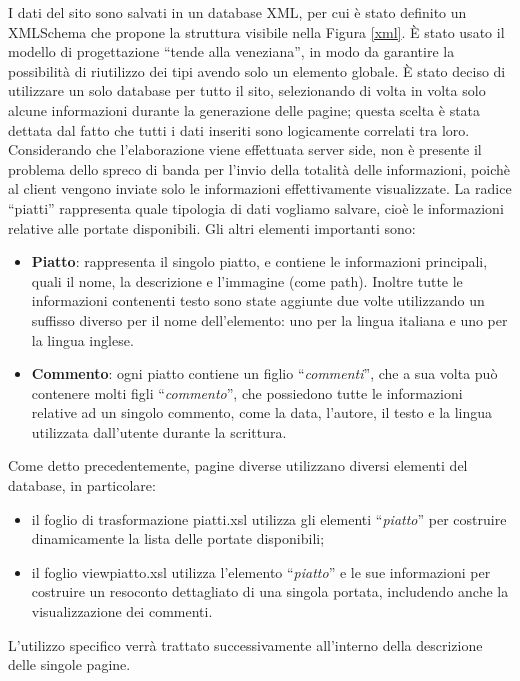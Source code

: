 \documentclass[10pt,a4paper,onecolumn]{article}
\begin{document}
I dati del sito sono salvati in un database XML, per cui è stato definito un XMLSchema che propone la struttura visibile nella Figura \ref{xml}. È stato usato il modello di progettazione ``tende alla veneziana'', in modo da garantire la possibilità di riutilizzo dei tipi avendo solo un elemento globale. 
È stato deciso di utilizzare un solo database per tutto il sito, selezionando di volta in volta solo alcune informazioni durante la generazione delle pagine; questa scelta è stata dettata dal fatto che tutti i dati inseriti sono logicamente correlati tra loro.
Considerando che l'elaborazione viene effettuata server side, non è presente il problema dello spreco di banda per l'invio della totalità delle informazioni, poichè al client vengono inviate solo le informazioni effettivamente visualizzate.
La radice ``piatti'' rappresenta quale tipologia di dati vogliamo salvare, cioè le informazioni relative alle portate disponibili.
Gli altri elementi importanti sono:
\begin{itemize}
 \item \textbf{Piatto}: rappresenta il singolo piatto, e contiene le informazioni principali, quali il nome, la descrizione e l'immagine (come path). Inoltre tutte le informazioni contenenti testo sono state aggiunte due volte utilizzando un suffisso diverso per il nome dell'elemento: uno per la lingua italiana e uno per la lingua inglese.
 \item \textbf{Commento}: ogni piatto contiene un figlio ``\textit{commenti}'', che a sua volta può contenere molti figli ``\textit{commento}'', che possiedono tutte le informazioni relative ad un singolo commento, come la data, l'autore, il testo e la lingua utilizzata dall'utente durante la scrittura.
\end{itemize}
Come detto precedentemente, pagine diverse utilizzano diversi elementi del database, in particolare:
\begin{itemize}
 \item il foglio di trasformazione piatti.xsl utilizza gli elementi ``\textit{piatto}'' per costruire dinamicamente la lista delle portate disponibili;
 \item il foglio viewpiatto.xsl utilizza l'elemento ``\textit{piatto}'' e le sue informazioni per costruire un resoconto dettagliato di una singola portata, includendo anche la visualizzazione dei commenti.
\end{itemize}
L'utilizzo specifico verrà trattato successivamente all'interno della descrizione delle singole pagine.
\end{document}
